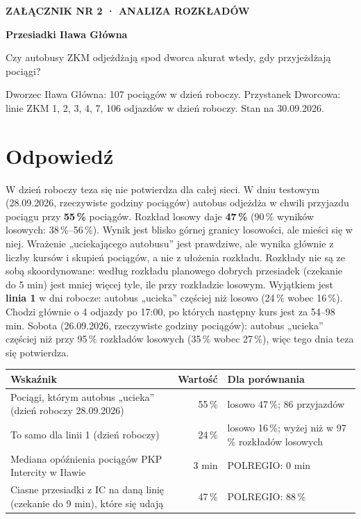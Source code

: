 \documentclass[10pt,a4paper]{article}
\newcommand{\mut}[1]{\textcolor{muted}{#1}}
\begin{document}
{\sffamily\footnotesize\bfseries\MakeUppercase{Załącznik nr 2 · analiza rozkładów}}\par\smallskip
{\sffamily\LARGE\bfseries Przesiadki Iława Główna}\par\medskip
{\large Czy autobusy ZKM odjeżdżają spod dworca akurat wtedy, gdy przyjeżdżają pociągi?}\par\medskip
{\small\mut{Dworzec Iława Główna: 107 pociągów w dzień roboczy. Przystanek Dworcowa: linie ZKM 1, 2, 3, 4, 7, 106 odjazdów w dzień roboczy. Stan na 30.09.2026.}}\par\bigskip
\section*{Odpowiedź}
W dzień roboczy teza się nie potwierdza dla całej sieci. W dniu testowym (28.09.2026, rzeczywiste godziny pociągów) autobus odjeżdża w chwili przyjazdu pociągu przy \textbf{55\,\%} pociągów. Rozkład losowy daje \textbf{47\,\%} (90\,\% wyników losowych: 38\,\%--56\,\%). Wynik jest blisko górnej granicy losowości, ale mieści się w niej. Wrażenie „uciekającego autobusu” jest prawdziwe, ale wynika głównie z liczby kursów i skupień pociągów, a nie z ułożenia rozkładu. Rozkłady nie są ze sobą skoordynowane: według rozkładu planowego dobrych przesiadek (czekanie do 5 min) jest mniej więcej tyle, ile przy rozkładzie losowym. Wyjątkiem jest \textbf{linia 1} w dni robocze: autobus „ucieka” częściej niż losowo (24\,\% wobec 16\,\%). Chodzi głównie o 4 odjazdy po 17:00, po których następny kurs jest za 54--98 min. Sobota (26.09.2026, rzeczywiste godziny pociągów): autobus „ucieka” częściej niż przy 95\,\% rozkładów losowych (35\,\% wobec 27\,\%), więc tego dnia teza się potwierdza.

{\small
\begin{center}\begin{tabular}{@{}p{9.2cm} r p{4.2cm}@{}}\toprule
Wskaźnik & Wartość & Dla porównania \\ \midrule
Pociągi, którym autobus „ucieka” (dzień roboczy 28.09.2026) & 55\,\% & losowo 47\,\%; 86 przyjazdów \\
To samo dla linii 1 (dzień roboczy) & 24\,\% & losowo 16\,\%; wyżej niż w 97\,\% rozkładów losowych \\
Mediana opóźnienia pociągów PKP Intercity w Iławie & 3 min & POLREGIO: 0 min \\
Ciasne przesiadki z IC na daną linię (czekanie do 9 min), które się udają & 47\,\% & POLREGIO: 88\,\% \\
\bottomrule\end{tabular}\end{center}}
\end{document}
